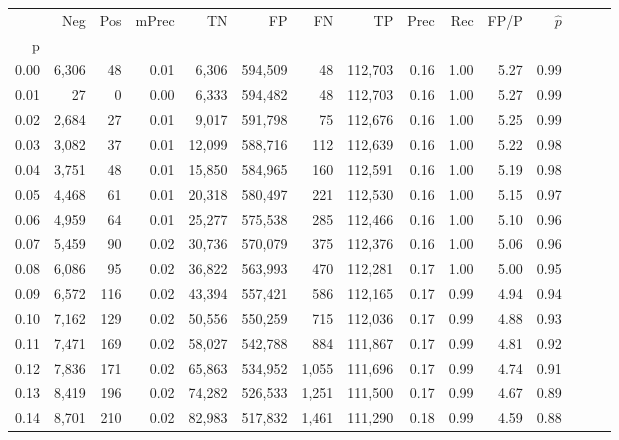 \begin{tabular}{rrrrrrrrrrrrrrr}
\toprule
{} &     Neg &    Pos & mPrec &       TN &       FP &       FN &       TP &  Prec &   Rec &  FP/P & $\hat{p}$ \\
p    &         &        &       &          &          &          &          &       &       &       &           \\
\midrule
0.00 &   6,306 &     48 &  0.01 &    6,306 &  594,509 &       48 &  112,703 &  0.16 &  1.00 &  5.27 &      0.99 \\
0.01 &      27 &      0 &  0.00 &    6,333 &  594,482 &       48 &  112,703 &  0.16 &  1.00 &  5.27 &      0.99 \\
0.02 &   2,684 &     27 &  0.01 &    9,017 &  591,798 &       75 &  112,676 &  0.16 &  1.00 &  5.25 &      0.99 \\
0.03 &   3,082 &     37 &  0.01 &   12,099 &  588,716 &      112 &  112,639 &  0.16 &  1.00 &  5.22 &      0.98 \\
0.04 &   3,751 &     48 &  0.01 &   15,850 &  584,965 &      160 &  112,591 &  0.16 &  1.00 &  5.19 &      0.98 \\
0.05 &   4,468 &     61 &  0.01 &   20,318 &  580,497 &      221 &  112,530 &  0.16 &  1.00 &  5.15 &      0.97 \\
0.06 &   4,959 &     64 &  0.01 &   25,277 &  575,538 &      285 &  112,466 &  0.16 &  1.00 &  5.10 &      0.96 \\
0.07 &   5,459 &     90 &  0.02 &   30,736 &  570,079 &      375 &  112,376 &  0.16 &  1.00 &  5.06 &      0.96 \\
0.08 &   6,086 &     95 &  0.02 &   36,822 &  563,993 &      470 &  112,281 &  0.17 &  1.00 &  5.00 &      0.95 \\
0.09 &   6,572 &    116 &  0.02 &   43,394 &  557,421 &      586 &  112,165 &  0.17 &  0.99 &  4.94 &      0.94 \\
0.10 &   7,162 &    129 &  0.02 &   50,556 &  550,259 &      715 &  112,036 &  0.17 &  0.99 &  4.88 &      0.93 \\
0.11 &   7,471 &    169 &  0.02 &   58,027 &  542,788 &      884 &  111,867 &  0.17 &  0.99 &  4.81 &      0.92 \\
0.12 &   7,836 &    171 &  0.02 &   65,863 &  534,952 &    1,055 &  111,696 &  0.17 &  0.99 &  4.74 &      0.91 \\
0.13 &   8,419 &    196 &  0.02 &   74,282 &  526,533 &    1,251 &  111,500 &  0.17 &  0.99 &  4.67 &      0.89 \\
0.14 &   8,701 &    210 &  0.02 &   82,983 &  517,832 &    1,461 &  111,290 &  0.18 &  0.99 &  4.59 &      0.88 \\

\end{tabular}
